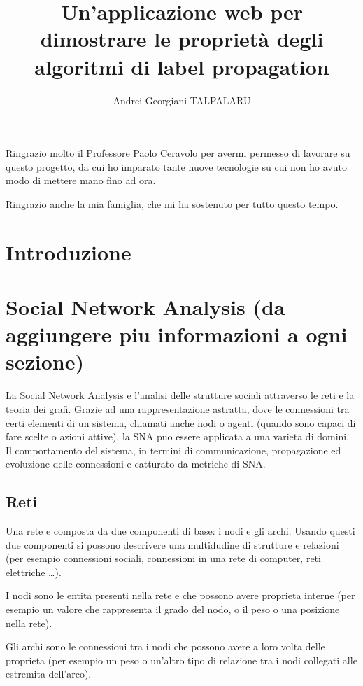 \documentclass[a4paper,12pt]{report}
\begin{document}
\setcounter{secnumdepth}{5}
\setcounter{tocdepth}{5}

\title{Un'applicazione web per dimostrare le proprietà degli algoritmi di label propagation}
\author{Andrei Georgiani TALPALARU}

\beforepreface
{}
Ringrazio molto il Professore Paolo Ceravolo per avermi permesso di lavorare su questo progetto, da cui ho imparato tante nuove tecnologie su cui non ho avuto modo di mettere mano fino ad ora. 

Ringrazio anche la mia famiglia, che mi ha sostenuto per tutto questo tempo.
\afterpreface
% 
% 
%		
\chapter{Introduzione}
%

\chapter{Social Network Analysis (da aggiungere piu informazioni a ogni sezione)}
	La Social Network Analysis e l'analisi delle strutture sociali attraverso le reti e la teoria dei grafi. \cite{snaintro}
	Grazie ad una rappresentazione astratta, dove le connessioni tra certi elementi di un sistema, chiamati anche nodi o agenti (quando sono capaci di fare scelte o azioni attive), la SNA puo essere applicata a una varieta di domini. Il comportamento del sistema, in termini di communicazione, propagazione ed evoluzione delle connessioni e catturato da metriche di SNA. \cite{avpra}

	\section{Reti}
	Una rete e composta da due componenti di base: i nodi e gli archi. Usando questi due componenti si possono descrivere una multidudine di strutture e relazioni (per esempio connessioni sociali, connessioni in una rete di computer, reti elettriche \dots). 

	 I nodi sono le entita presenti nella rete e che possono avere proprieta interne (per esempio un valore che rappresenta il grado del nodo, o il peso o una posizione nella rete). 

	Gli archi sono le connessioni tra i nodi che possono avere a loro volta delle proprieta (per esempio un peso o un'altro tipo di relazione tra i nodi collegati alle estremita dell'arco).	\cite{snaintro} 
\end{document}
